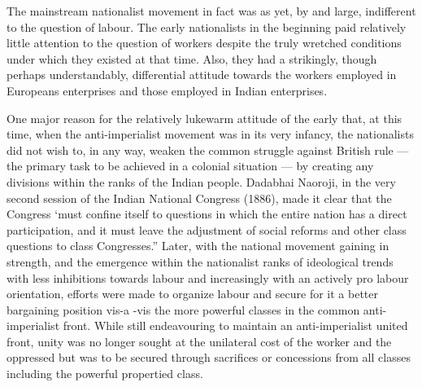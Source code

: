 The mainstream nationalist movement in fact was as yet, by and large, indifferent to the question of labour. The early nationalists in the beginning paid relatively little attention to the question of workers despite the truly wretched conditions under which they existed at that time. Also, they had a strikingly, though perhaps understandably, differential attitude towards the workers employed in Europeans enterprises and those employed in Indian enterprises.

One major reason for the relatively lukewarm attitude of the early that, at this time, when the anti-imperialist movement was in its very infancy, the nationalists did not wish to, in any way, weaken the common struggle against British rule — the primary task to be achieved in a colonial situation — by creating any divisions within the ranks of the Indian people. Dadabhai Naoroji, in the very second session of the Indian National Congress (1886), made it clear that the Congress ‘must confine itself to questions in which the entire nation has a direct participation, and it must leave the adjustment of social reforms and other class questions to class Congresses.” Later, with the national movement gaining in strength, and the emergence within the nationalist ranks of ideological trends with less inhibitions towards labour and increasingly with an actively pro­ labour orientation, efforts were made to organize labour and secure for it a better bargaining position vis-a -vis the more powerful classes in the common anti-imperialist front. While still endeavouring to maintain an anti-imperialist united front, unity was no longer sought at the unilateral cost of the worker and the oppressed but was to be secured through sacrifices or concessions from all classes including the powerful propertied class.

